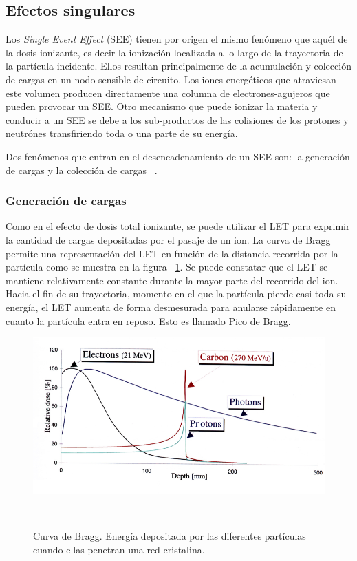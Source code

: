 \documentclass[a4paper,openright,12pt]{report}
\begin{document}
\subsection{Efectos singulares}


Los \textit{Single Event Effect} (SEE) tienen por origen el mismo fenómeno que aquél de la dosis ionizante, es decir la ionización localizada a lo largo de la trayectoria de la partícula incidente. Ellos resultan principalmente de la acumulación y  colección de cargas en un nodo sensible de circuito. Los iones energéticos que atraviesan este volumen producen directamente una columna de electrones-agujeros que pueden provocar un SEE. Otro mecanismo que puede ionizar la materia y conducir a un SEE se debe a los sub-productos de las colisiones de los protones y  neutrónes transfiriendo toda o una parte de su energía.

Dos fenómenos que entran en el desencadenamiento de un SEE son: la generación de cargas y la colección de cargas ~\cite{duzellier2004space}.


\subsubsection{Generación de cargas}

Como en el efecto de dosis total ionizante, se puede utilizar el LET  para exprimir la cantidad de cargas depositadas por el pasaje de un ion. La curva de Bragg permite una representación del LET en función de la distancia recorrida por la partícula como se muestra en la  figura ~\ref{peak}. Se puede constatar que el LET se mantiene relativamente constante durante la mayor parte del recorrido del ion. Hacia el fin de su trayectoria,  momento  en el que la partícula pierde casi toda su energía, el LET aumenta de  forma desmesurada  para anularse rápidamente en cuanto la partícula entra en reposo. Esto es llamado Pico de Bragg. 

\begin{figure}[H]
	\centering
	\includegraphics[width=0.6 \textwidth]{img/peak.png}
	\caption{Curva de Bragg. Energía depositada por las diferentes partículas cuando ellas penetran una red cristalina.  }~\cite{CERN123} 
	\label{peak}
\end{figure}
\end{document}

